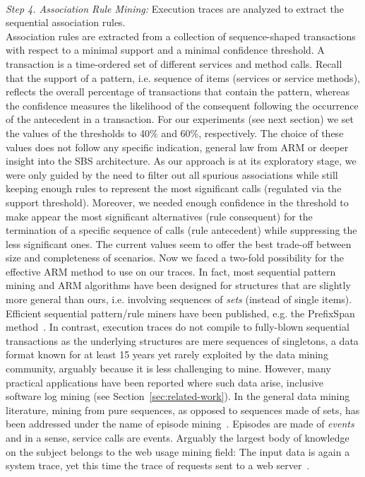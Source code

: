 \noindent \emph{\\Step 4. Association Rule Mining:} Execution traces are analyzed to extract the sequential association rules.
\vspace{0.15cm}
\\
\noindent Association rules are extracted from
a collection of sequence-shaped transactions 
with respect to a minimal support and a minimal confidence threshold.  A transaction is a time-ordered set of different services and method calls. 
Recall that the support of a pattern, i.e. sequence of items (services or service methods),
reflects the overall percentage of transactions that contain the pattern,
whereas the confidence measures the likelihood of the consequent following
the occurrence of the antecedent in a transaction.
For our experiments (see next section) we set the values of
the thresholds to  40\% and 60\%, respectively.
The choice of these values does not follow any
specific indication, general law from ARM or deeper insight
into the SBS architecture.
As our approach is at its exploratory stage,
we were only guided by the need to filter out all spurious
associations while still keeping enough rules to represent the
most significant calls (regulated via the support threshold).
Moreover, we needed enough confidence in the threshold to make appear
the most significant alternatives (rule consequent) for the termination of
a specific sequence of calls (rule antecedent) while suppressing the
less significant ones.  
 The current values seem to offer the best trade-off between size and completeness of scenarios. Now we faced a two-fold possibility for the effective ARM method
to use on our traces. In fact, most sequential pattern mining and ARM algorithms
have been designed for structures that are slightly more general than ours, i.e.
involving sequences of \textit{sets} (instead of single items).
Efficient sequential pattern/rule miners have been published, e.g. the PrefixSpan method~\cite{pei2004mining}.
In contrast, execution traces do not compile to fully-blown sequential transactions as the underlying structures are mere sequences of singletons, a data format known for at least 15 years yet rarely exploited by the data mining community, arguably because it is less challenging to mine. However, many practical applications have been reported where such data arise, inclusive software log mining (see Section~\ref{sec:related-work}). In the general data mining literature, mining from pure sequences, as opposed to sequences made of sets, has been addressed under the name of episode mining~\cite{DMKD}. Episodes are made of \textit{events} and in a sense, service calls are events. Arguably the largest body of knowledge on the subject belongs to the web usage mining field: The input data is again a system trace, yet this time the trace of requests sent to a web server~\cite{pei2000mining}.
